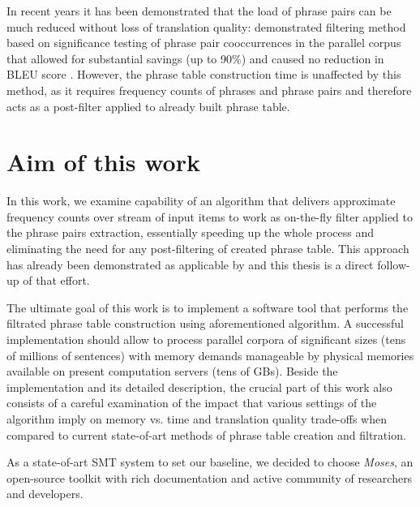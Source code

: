 In recent years it has been demonstrated that the load of phrase pairs can
be much reduced without loss of translation quality:
\citet{johnson:sigfilter} demonstrated filtering method based on significance
testing of phrase pair cooccurrences in the parallel corpus that allowed for
substantial savings (up to 90\%) and caused no reduction in BLEU score
\citep{papineni:bleu}.
However, the phrase table construction time is unaffected by this method,
as it requires frequency counts of phrases and phrase pairs and therefore acts
as a post-filter applied to already built phrase table.


\section{Aim of this work}

In this work, we examine capability of an algorithm that delivers approximate
frequency counts over stream of input items \citep{manku:lossycounting} to
work as on-the-fly filter applied to the phrase pairs extraction,
essentially speeding up the whole process and eliminating the need for
any post-filtering of created phrase table.
This approach has already been demonstrated as applicable by \citet{przywara:eppex}
and this thesis is a direct follow-up of that effort.

The ultimate goal of this work is to implement a software tool that performs
the filtrated phrase table construction using aforementioned algorithm.
A successful implementation should allow to process parallel corpora of
significant sizes (tens of millions of sentences) with memory demands manageable
by physical memories available on present computation servers (tens of GBs).
Beside the implementation and its detailed description, the crucial part of
this work also consists of a careful examination of the impact that various
settings of the algorithm imply on memory vs. time and translation quality
trade-offs when compared to current state-of-art methods of phrase table
creation and filtration.

As a state-of-art SMT system to set our baseline, we decided to choose
\emph{Moses}, an open-source toolkit
with rich documentation and active community of researchers and developers.

